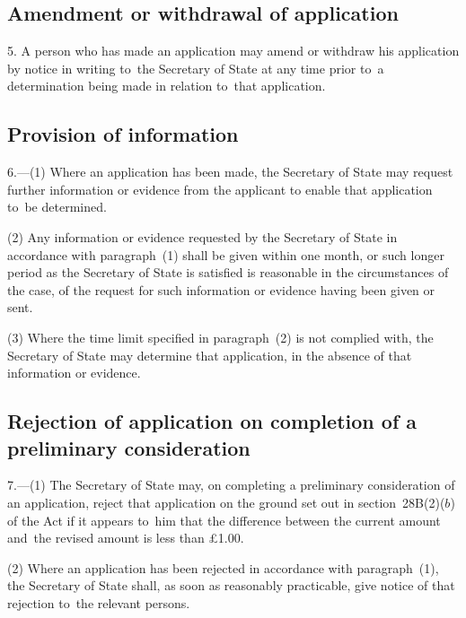 \documentclass[12pt,a4paper]{article}
\begin{document}
\subsection[5. Amendment or withdrawal of application]{Amendment or withdrawal of application}

5. A person who has made an application
may amend or withdraw his application by notice in writing to~the Secretary of
State at any time prior to~a determination being made in relation to~that
application.

\subsection[6. Provision of information]{Provision of information}

6.—(1) Where an application has been made, the Secretary
of State may request further information or evidence from the applicant to
enable that application to~be determined.

(2) Any information or evidence requested by the Secretary of State in accordance with paragraph~(1) shall be given within 
one month, or such longer period as the Secretary of State is satisfied is reasonable in the circumstances of the case,  %
of the request for such information or evidence having been given or sent.

(3) Where the time limit specified in paragraph~(2) is not complied with, the
Secretary of State may determine that application, in the absence of that
information or evidence.


\subsection[7. Rejection of application on completion of a preliminary consideration]{Rejection of application on completion of a preliminary consideration}

7.—(1) The
Secretary of State may, on completing a preliminary consideration of an
application, reject that application on the ground set out in section~28B(2)($b$)
of the Act if it appears to~him that the difference between the current amount
and~the revised amount is less than £1$.$00.

(2) Where an application has been rejected in accordance with paragraph~(1), the
Secretary of State shall, as soon as reasonably practicable, give notice of that
rejection to~the relevant persons.
\end{document}
